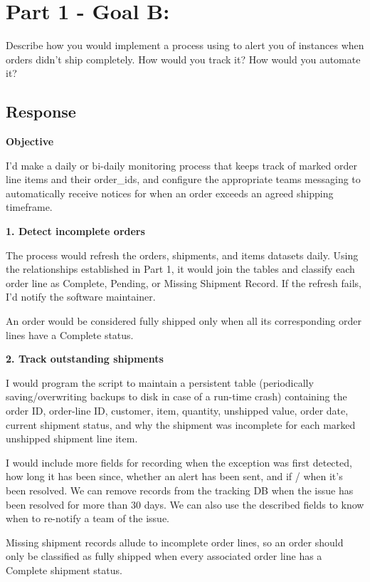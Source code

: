 \documentclass[
]{article}
\begin{document}
\section{Part 1 - Goal B:}\label{part-1---goal-b}

Describe how you would implement a process using to alert you of
instances when orders didn't ship completely. How would you track it?
How would you automate it?

\subsection{Response}\label{p1BSolution}

\textbf{Objective}

I'd make a daily or bi-daily monitoring process that keeps track of
marked order line items and their order\_ids, and configure the
appropriate teams messaging to automatically receive notices for when an
order exceeds an agreed shipping timeframe.

\textbf{1. Detect incomplete orders}

The process would refresh the orders, shipments, and items datasets
daily. Using the relationships established in Part 1, it would join the
tables and classify each order line as Complete, Pending, or Missing
Shipment Record. If the refresh fails, I'd notify the software
maintainer.

An order would be considered fully shipped only when all its
corresponding order lines have a Complete status.

\textbf{2. Track outstanding shipments}

I would program the script to maintain a persistent table (periodically
saving/overwriting backups to disk in case of a run-time crash)
containing the order ID, order-line ID, customer, item, quantity,
unshipped value, order date, current shipment status, and why the
shipment was incomplete for each marked unshipped shipment line item.

I would include more fields for recording when the exception was first
detected, how long it has been since, whether an alert has been sent,
and if / when it's been resolved. We can remove records from the
tracking DB when the issue has been resolved for more than 30 days. We
can also use the described fields to know when to re-notify a team of
the issue.

Missing shipment records allude to incomplete order lines, so an order
should only be classified as fully shipped when every associated order
line has a Complete shipment status.
\end{document}
